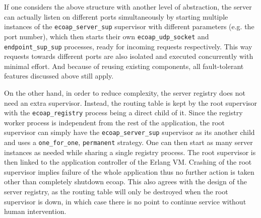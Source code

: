 If one considers the above structure with another level of abstraction, the server can actually listen on different ports simultaneously by starting multiple instances of the \verb|ecoap_server_sup| supervisor with different parameters (e.g. the port number), which then starts their own \verb|ecoap_udp_socket| and \verb|endpoint_sup_sup| processes, ready for incoming requests respectively. This way requests towards different ports are also isolated and executed concurrently with minimal effort. And because of reusing existing components, all fault-tolerant features discussed above still apply.

On the other hand, in order to reduce complexity, the server registry does not need an extra supervisor. Instead, the routing table is kept by the root supervisor with the \verb|ecoap_registry| process being a direct child of it. Since the registry worker process is independent from the rest of the application, the root supervisor can simply have the \verb|ecoap_server_sup| supervisor as its another child and uses a \verb|one_for_one|, \verb|permanent| strategy. One can then start as many server instances as needed while sharing a single registry process. The root supervisor is then linked to the application controller of the Erlang VM. Crashing of the root supervisor implies failure of the whole application thus no further action is taken other than completely shutdown ecoap. This also agrees with the design of the server registry, as the routing table will only be destroyed when the root supervisor is down, in which case there is no point to continue service without human intervention.



